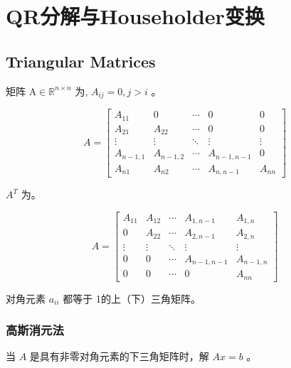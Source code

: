 \chapter{QR分解与Householder变换}

\section{Triangular Matrices}

\begin{definition}
    矩阵 $ \mathrm{A} \in \mathbb{R}^{n \times n} $ 为, $ A_{i j}=0, j>i $ 。

    $$ A=\left[\begin{array}{ccccc}A_{11} & 0 & \cdots & 0 & 0 \\ A_{21} & A_{22} & \cdots & 0 & 0 \\ \vdots & \vdots & \ddots & \vdots & \vdots \\ A_{n-1,1} & A_{n-1,2} & \cdots & A_{n-1, n-1} & 0 \\ A_{n 1} & A_{n 2} & \cdots & A_{n, n-1} & A_{n n}\end{array}\right] $$
\end{definition}

\begin{definition}
    $ A^{T} $ 为。

    $$ A=\left[\begin{array}{ccccc}A_{11} & A_{12} & \cdots & A_{1, n-1} & A_{1, n} \\ 0 & A_{22} & \cdots & A_{2, n-1} & A_{2, n} \\ \vdots & \vdots & \ddots & \vdots & \vdots \\ 0 & 0 & \cdots & A_{n-1, n-1} & A_{n-1, n} \\ 0 & 0 & \cdots & 0 & A_{n n}\end{array}\right] $$
\end{definition}

\begin{definition}
    对角元素 $ a_{i i} $ 都等于 1的上（下）三角矩阵。
\end{definition}

\subsection{高斯消元法}

\begin{problem}
    当 $ A $ 是具有非零对角元素的下三角矩阵时，解 $ A x=b $ 。
\end{problem}

